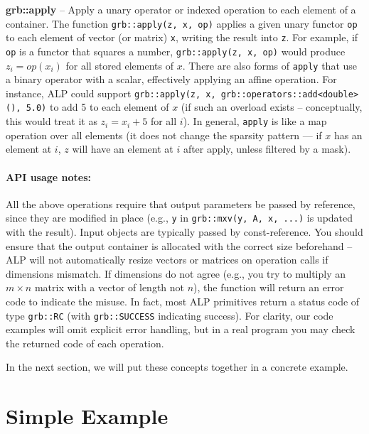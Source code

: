       \textbf{grb::apply} – Apply a unary operator or indexed operation to each element of a container. The function \texttt{grb::apply(z, x, op)} applies a given unary functor \texttt{op} to each element of vector (or matrix) \texttt{x}, writing the result into \texttt{z}. For example, if \texttt{op} is a functor that squares a number, \texttt{grb::apply(z, x, op)} would produce $z_i = \textit{op}(x_i)$ for all stored elements of $x$. There are also forms of \texttt{apply} that use a binary operator with a scalar, effectively applying an affine operation. For instance, ALP could support \texttt{grb::apply(z, x, grb::operators::add<double>(), 5.0)} to add 5 to each element of $x$ (if such an overload exists – conceptually, this would treat it as $z_i = x_i + 5$ for all $i$). In general, \texttt{apply} is like a map operation over all elements (it does not change the sparsity pattern — if $x$ has an element at $i$, $z$ will have an element at $i$ after apply, unless filtered by a mask).

\paragraph{API usage notes:} All the above operations require that output parameters be passed by reference, since they are modified in place (e.g., \texttt{y} in \texttt{grb::mxv(y, A, x, ...)} is updated with the result). Input objects are typically passed by const-reference. You should ensure that the output container is allocated with the correct size beforehand – ALP will not automatically resize vectors or matrices on operation calls if dimensions mismatch. If dimensions do not agree (e.g., you try to multiply an $m\times n$ matrix with a vector of length not $n$), the function will return an error code to indicate the misuse. In fact, most ALP primitives return a status code of type \texttt{grb::RC} (with \texttt{grb::SUCCESS} indicating success). For clarity, our code examples will omit explicit error handling, but in a real program you may check the returned code of each operation.

In the next section, we will put these concepts together in a concrete example.



\section{Simple Example}\label{sec:simple_example}

